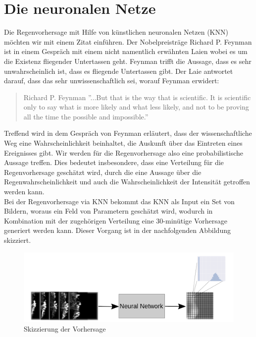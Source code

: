\newpage

\section{Die neuronalen Netze}\label{die neuronalen netze}

Die Regenvorhersage mit Hilfe von künstlichen neuronalen Netzen (KNN) möchten wir mit einem Zitat einführen.
Der Nobelpreisträge Richard P. Feynman ist in einem Gespräch mit einem nicht namentlich erwähnten Laien wobei es um die Existenz fliegender Untertassen geht. Feynman trifft die Aussage, dass es sehr unwahrscheinlich ist, dass es fliegende Untertassen gibt. Der Laie antwortet darauf, dass das sehr unwissenschaftlich sei, worauf Feynman erwidert:

\begin{quote}{Richard P. Feynman}
''...But that is the way that is scientific. It is scientific only to say what is more likely and what less likely, and not to be proving all the time the possible and impossible.''  
\end{quote}

\noindent Treffend wird in dem Gespräch von Feynman erläutert, dass der wissenschaftliche Weg eine Wahrscheinlichkeit beinhaltet, die Auskunft über das Eintreten eines Ereignisses gibt. Wir werden für die Regenvorhersage also eine probabilistische Aussage treffen. Dies bedeutet insbesondere, dass eine Verteilung für die Regenvorhersage geschätzt wird, durch die eine Aussage über die Regenwahrscheinlichkeit und auch die Wahrscheinlichkeit der Intensität getroffen werden kann.\\

\noindent Bei der Regenvorhersage via KNN bekommt das KNN als Input ein Set von Bildern, woraus ein Feld von Parametern geschätzt wird, wodurch in Kombination mit der zugehörigen Verteilung eine 30-minütige Vorhersage generiert werden kann. Dieser Vorgang ist in der nachfolgenden Abbildung skizziert.


\begin{figure}[htb]
 \centering
 \includegraphics[width=1.0\textwidth,angle=0]{abb/skizzierung_regenvorhersage}
 \caption{Skizzierung der Vorhersage}
\label{fig:Vorhersage_skizze}
\end{figure}


